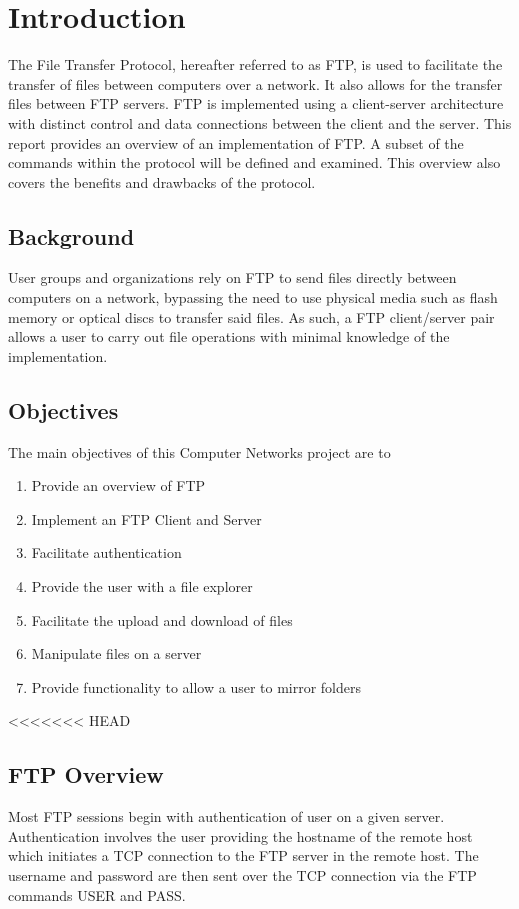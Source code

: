 \chapter{Introduction}
The File Transfer Protocol, hereafter referred to as FTP, is used to
facilitate the transfer of files between computers over a network. It also
allows for the transfer files between FTP servers.
FTP is implemented using a client-server architecture with distinct control
and data connections between the client and the server. This report provides an
overview of an implementation of FTP. A subset of the commands within the protocol
will be defined and examined. This overview also covers the benefits and drawbacks
of the protocol.


\section{Background}
User groups and organizations rely on FTP to send files directly between computers on a network,
bypassing the need to use physical media such as flash memory or optical discs to transfer said files.
As such, a FTP client/server pair allows a user to carry out file operations with minimal knowledge of the implementation.

\newpage

\section{Objectives}
The main objectives of this Computer Networks project are to
\begin{enumerate}
\item Provide an overview of FTP
\item Implement an FTP Client and Server
\item Facilitate authentication
\item Provide the user with a file explorer
\item Facilitate the upload and download of files
\item Manipulate files on a server
\item Provide functionality to allow a user to mirror folders
\end{enumerate}

<<<<<<< HEAD
\section{FTP Overview}
Most FTP sessions begin with authentication of user on a given server. Authentication involves the user providing the hostname of the remote host which initiates a TCP
connection to the FTP server in the remote host. The username and password are then sent over the TCP connection via the FTP commands USER and PASS. \par

